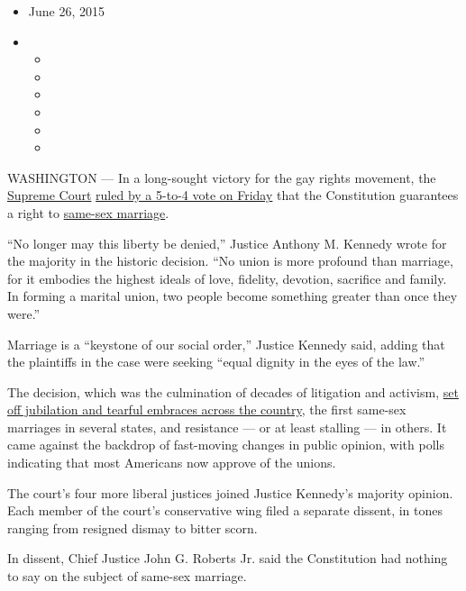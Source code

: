 \begin{itemize}
\item
  June 26, 2015
\item
  \begin{itemize}
  \item
  \item
  \item
  \item
  \item
  \item
  \end{itemize}
\end{itemize}

WASHINGTON --- In a long-sought victory for the gay rights movement, the
\href{http://topics.nytimes.com/top/reference/timestopics/organizations/s/supreme_court/index.html?inline=nyt-org}{Supreme
Court}
\href{http://www.supremecourt.gov/opinions/14pdf/14-556_3204.pdf}{ruled
by a 5-to-4 vote on Friday} that the Constitution guarantees a right to
\href{http://topics.nytimes.com/top/reference/timestopics/subjects/s/same_sex_marriage/index.html?inline=nyt-classifier}{same-sex
marriage}.

``No longer may this liberty be denied,'' Justice Anthony M. Kennedy
wrote for the majority in the historic decision. ``No union is more
profound than marriage, for it embodies the highest ideals of love,
fidelity, devotion, sacrifice and family. In forming a marital union,
two people become something greater than once they were.''

Marriage is a ``keystone of our social order,'' Justice Kennedy said,
adding that the plaintiffs in the case were seeking ``equal dignity in
the eyes of the law.''

The decision, which was the culmination of decades of litigation and
activism,
\href{http://www.nytimes.com/live/supreme-court-rulings/?hp\&action=click\&pgtype=Homepage\&module=a-lede-package-region\&region=top-news\&WT.nav=top-news}{set
off jubilation and tearful embraces across the country}, the first
same-sex marriages in several states, and resistance --- or at least
stalling --- in others. It came against the backdrop of fast-moving
changes in public opinion, with polls indicating that most Americans now
approve of the unions.

The court's four more liberal justices joined Justice Kennedy's majority
opinion. Each member of the court's conservative wing filed a separate
dissent, in tones ranging from resigned dismay to bitter scorn.

In dissent, Chief Justice John G. Roberts Jr. said the Constitution had
nothing to say on the subject of same-sex marriage.

